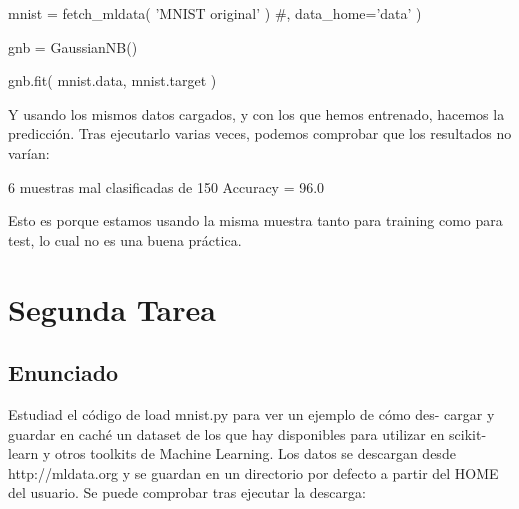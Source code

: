 \documentclass[12pt,twoside]{article}
\begin{document}
mnist = fetch_mldata( 'MNIST original' ) #, data_home='data' )

gnb = GaussianNB()

gnb.fit( mnist.data, mnist.target )

Y usando los mismos datos cargados, y con los que hemos entrenado, hacemos la predicción. Tras ejecutarlo varias veces, podemos comprobar que los resultados no varían:

6 muestras mal clasificadas de 150
Accuracy = 96.0%

Esto es porque estamos usando la misma muestra tanto para training como para test, lo cual no es una buena práctica.

\section{Segunda Tarea}

\subsection{Enunciado}

\noindent
Estudiad el código de load mnist.py para ver un ejemplo de cómo des-
cargar y guardar en caché un dataset de los que hay disponibles para utilizar
en scikit-learn y otros toolkits de Machine Learning.
Los datos se descargan desde http://mldata.org y se guardan en un
directorio por defecto a partir del HOME del usuario. Se puede comprobar tras
ejecutar la descarga:
\end{document}
